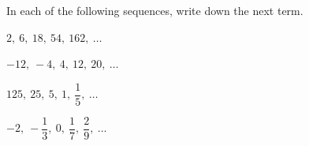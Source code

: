  In each of the following sequences, write down the next term.

\begin{subparts}
  \item $2,\ 6,\ 18,\ 54,\ 162,\ \ldots$
  \item $-12,\ -4,\ 4,\ 12,\ 20,\ \ldots$
  \item $125,\ 25,\ 5,\ 1,\ \dfrac{1}{5},\ \ldots$
  \item $-2,\ -\dfrac{1}{3},\ 0,\ \dfrac{1}{7},\ \dfrac{2}{9},\ \ldots$
\end{subparts}

